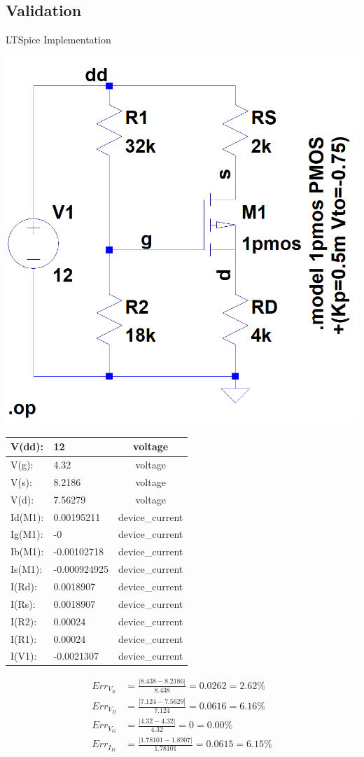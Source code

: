 \documentclass[12pt,letterpaper,titlepage]{article}
\begin{document}
\begin{raggedright}
\clearpage
\subsection{Validation}

\begin{center}
LTSpice Implementation
\begin{paracol}{2}
\includegraphics[width=.5\textwidth, height=\textheight, keepaspectratio=true]{ds2b}
\switchcolumn
\begin{tabular}{|l|l|c|}
  \hline V(dd):	 & 12	        & voltage
\\\hline V(g):	 & 4.32	        & voltage
\\\hline V(s):	 & 8.2186	    & voltage
\\\hline V(d):	 & 7.56279	    & voltage
\\\hline Id(M1): & 0.00195211	& device\_current
\\\hline Ig(M1): & -0	        & device\_current
\\\hline Ib(M1): & -0.00102718	& device\_current
\\\hline Is(M1): & -0.000924925	& device\_current
\\\hline I(Rd):	 & 0.0018907	& device\_current
\\\hline I(Rs):	 & 0.0018907	& device\_current
\\\hline I(R2):	 & 0.00024	    & device\_current
\\\hline I(R1):	 & 0.00024	    & device\_current
\\\hline I(V1):	 & -0.0021307	& device\_current
\\\hline
\end{tabular}
\end{paracol}
\begin{align*}
   Err_{V_S} &= \frac{|8.438-8.2186|}{8.438} = 0.0262 = 2.62\%
\\ Err_{V_D} &= \frac{|7.124-7.5629|}{7.124} = 0.0616 = 6.16\%
\\ Err_{V_G} &= \frac{|4.32-4.32|}{4.32} = 0 = 0.00\%
\\ Err_{I_D} &= \frac{|1.78101-1.8907|}{1.78101} = 0.0615 = 6.15\%
\end{align*}


\end{center}
\end{raggedright}
\end{document}
